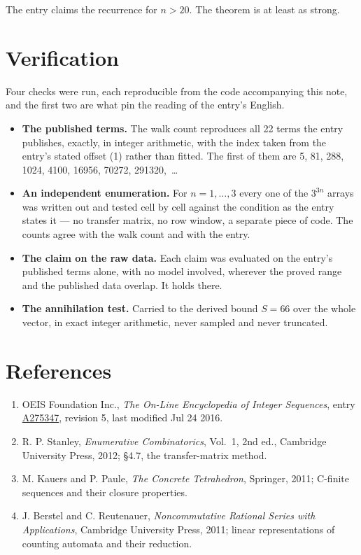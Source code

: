 \documentclass[11pt]{article}
\theoremstyle{definition}
\begin{document}
The entry claims the recurrence for $n > 20$. The theorem is at least as strong.

\section{Verification}

Four checks were run, each reproducible from the code accompanying this note, and the first two are what pin the reading of the entry's English.

\begin{itemize}

\item {\bfseries The published terms.} The walk count reproduces all 22 terms the entry publishes, exactly, in integer arithmetic, with the index taken from the entry's stated offset (1) rather than fitted. The first of them are 5, 81, 288, 1024, 4100, 16956, 70272, 291320,~\dots

\item {\bfseries An independent enumeration.} For $n = 1,\dots,3$ every one of the $3^{3n}$ arrays was written out and tested cell by cell against the condition as the entry states it --- no transfer matrix, no row window, a separate piece of code. The counts agree with the walk count and with the entry.

\item {\bfseries The claim on the raw data.} Each claim was evaluated on the entry's published terms alone, with no model involved, wherever the proved range and the published data overlap. It holds there.

\item {\bfseries The annihilation test.} Carried to the derived bound $S = 66$ over the whole vector, in exact integer arithmetic, never sampled and never truncated.

\end{itemize}

\section{References}

\begin{enumerate}

\item OEIS Foundation Inc., \emph{The On-Line Encyclopedia of Integer Sequences}, entry \href{https://oeis.org/A275347}{A275347}, revision 5, last modified Jul 24 2016.

\item R. P. Stanley, \emph{Enumerative Combinatorics}, Vol.~1, 2nd ed., Cambridge University Press, 2012; \S4.7, the transfer-matrix method.

\item M. Kauers and P. Paule, \emph{The Concrete Tetrahedron}, Springer, 2011; C-finite sequences and their closure properties.

\item J. Berstel and C. Reutenauer, \emph{Noncommutative Rational Series with Applications}, Cambridge University Press, 2011; linear representations of counting automata and their reduction.

\end{enumerate}
\end{document}
